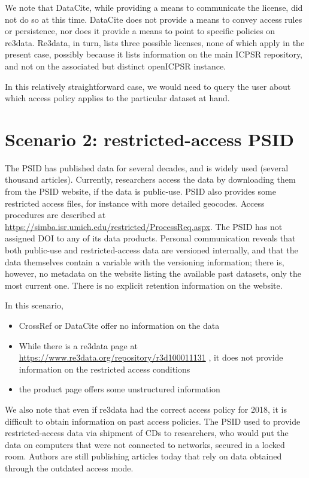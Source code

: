 We note that DataCite, while providing a means to communicate the license, did not do so at this time. DataCite does not provide a means to convey access rules or persistence, nor does it provide a means to point to specific policies on re3data. Re3data, in turn, lists three possible licenses, none of which apply in the present case, possibly because it lists information on the main ICPSR repository, and not on the associated but distinct openICPSR instance.

In this relatively straightforward case, we would need to query the user  about  which access policy applies to the particular dataset at hand. 

\section{Scenario 2: restricted-access PSID}
The \ac{PSID} has published data for several decades, and is widely used (several thousand articles). Currently, researchers access the data by downloading them from the \ac{PSID} website, if the data is public-use. \ac{PSID} also provides some restricted access files, for instance with more detailed geocodes. Access procedures are described at \url{https://simba.isr.umich.edu/restricted/ProcessReq.aspx}. The \ac{PSID} has not assigned \ac{DOI} to any of its data products. Personal communication reveals that both public-use and restricted-access data are versioned internally, and that the data themselves contain a variable with the versioning information; there is, however, no metadata on the website listing the available past datasets, only the most current one. There is no explicit retention information on the website.

In this scenario, 
\begin{itemize}
	\item CrossRef or DataCite offer no information on the data
	\item While there is a re3data page at \url{https://www.re3data.org/repository/r3d100011131} \parencite{Re3data-psid}, it does not provide information on the restricted access conditions
	\item the product page offers some unstructured information
\end{itemize}
We also note that even if re3data had the correct access policy for 2018, it is difficult to obtain information on past access policies. The \ac{PSID} used to provide restricted-access data via shipment of CDs to researchers, who would put the data on computers that were not connected to networks, secured in a locked room. Authors are still publishing articles today that rely on data obtained through the outdated access mode. 

